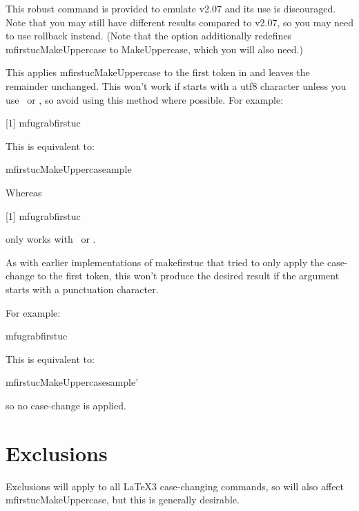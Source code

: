 \documentclass[titlepage=false,oneside,
 fontsize=12pt,captions=tableheading]{scrbook}
\begin{document}
This robust command is provided to emulate v2.07 and its use is discouraged.
Note that you may still have different results compared to v2.07, so
you may need to use rollback instead. (Note that the  option
additionally redefines \gls{mfirstucMakeUppercase} to
\gls{MakeUppercase}, which you will also need.)

This applies \gls{mfirstucMakeUppercase} to the first token in 
and leaves the remainder unchanged. This won't work if 
starts with a \gls{utf8} character unless you use \XeLaTeX\ or
\LuaLaTeX, so avoid using this method where possible. For example:
\begin{codebox}
[1]
\gls{mfugrabfirstuc}
\end{codebox}
This is equivalent to:
\begin{codebox}
\gls{mfirstucMakeUppercase}ample
\end{codebox}
Whereas
\begin{unicodebox}
[1]
\gls{mfugrabfirstuc}
\end{unicodebox}
only works with \XeLaTeX\ or \LuaLaTeX.

\begin{warning}
As with earlier implementations of \gls{makefirstuc} that 
tried to only apply the case-change to the first token, 
this won't produce the desired result if the argument starts with a
punctuation character.
\end{warning}

For example:
\begin{codebox}
\gls{mfugrabfirstuc}
\end{codebox}
This is equivalent to:
\begin{compactcodebox}
\gls{mfirstucMakeUppercase}sample'
\end{compactcodebox}
so no case-change is applied.

\section{Exclusions}
\label{sec:exclusions}

\begin{information}
Exclusions will apply to all \LaTeX3 case-changing commands, so will
also affect \gls{mfirstucMakeUppercase}, but this is generally
desirable.
\end{information}
\end{document}
